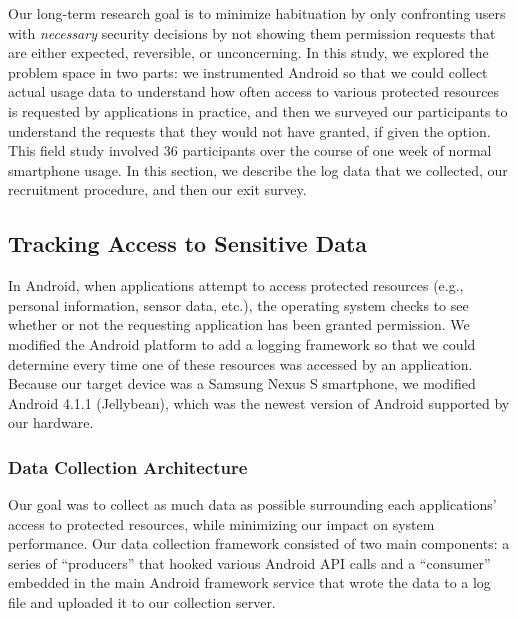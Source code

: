\documentclass[letterpaper,twocolumn,10pt]{article}
\begin{document}
Our long-term research goal is to minimize habituation by only confronting users with {\it necessary} security decisions by not showing them permission requests that are either expected, reversible, or unconcerning. In this study, we explored the problem space in two parts: we instrumented Android so that we could collect actual usage data to understand how often access to various protected resources is requested by applications in practice, and then we surveyed our participants to understand the requests that they would not have granted, if given the option. This field study involved 36 participants over the course of one week of normal smartphone usage. In this section, we describe the log data that we collected, our recruitment procedure, and then our exit survey.







\subsection{Tracking Access to Sensitive Data}

In Android, when applications attempt to access protected resources (e.g., personal information, sensor data, etc.), the operating system checks to see whether or not the requesting application has been granted permission. We modified the Android platform to add a logging framework so that we could determine every time one of these resources was accessed by an application. Because our target device was a Samsung Nexus S smartphone, we modified Android 4.1.1 (Jellybean), which was the newest version of Android supported by our hardware.

\subsubsection{Data Collection Architecture}

Our goal was to collect as much data as possible surrounding each applications' access to protected resources, while minimizing our impact on system performance. Our data collection framework consisted of two main components: a series of ``producers'' that 
hooked various Android API calls and a ``consumer'' embedded in the main Android framework service that wrote the data to a log file and uploaded it to our collection server. 
\end{document}
